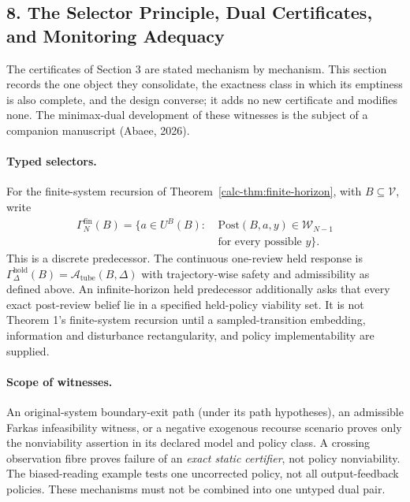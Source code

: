 \documentclass[10pt,twocolumn]{article}
\theoremstyle{definition}
\begin{document}
\subsection{8. The Selector Principle, Dual Certificates, and Monitoring Adequacy}\label{calc-selector-principle}

The certificates of Section 3 are stated mechanism by mechanism. This section records the one object they consolidate, the exactness class in which its emptiness is also complete, and the design converse; it adds no new certificate and modifies none. The minimax-dual development of these witnesses is the subject of a companion manuscript (Abaee, 2026).

\paragraph{Typed selectors.} For the finite-system recursion of Theorem~\ref{calc-thm:finite-horizon}, with \(B\subseteq\mathcal V\), write
\[\begin{aligned}
\Gamma_N^{\mathrm{fin}}(B)=\{a\in U^B(B):\ &\mathrm{Post}(B,a,y)\in\mathcal W_{N-1}\\
&\text{for every possible }y\}.
\end{aligned}\]
This is a discrete predecessor. The continuous one-review held response is \(\Gamma_\Delta^{\mathrm{hold}}(B)=\mathcal A_{\mathrm{tube}}(B,\Delta)\) with trajectory-wise safety and admissibility as defined above. An infinite-horizon held predecessor additionally asks that every exact post-review belief lie in a specified held-policy viability set. It is not Theorem 1's finite-system recursion until a sampled-transition embedding, information and disturbance rectangularity, and policy implementability are supplied.

\paragraph{Scope of witnesses.} An original-system boundary-exit path (under its path hypotheses), an admissible Farkas infeasibility witness, or a negative exogenous recourse scenario proves only the nonviability assertion in its declared model and policy class. A crossing observation fibre proves failure of an \emph{exact static certifier}, not policy nonviability. The biased-reading example tests one uncorrected policy, not all output-feedback policies. These mechanisms must not be combined into one untyped dual pair.
\end{document}

